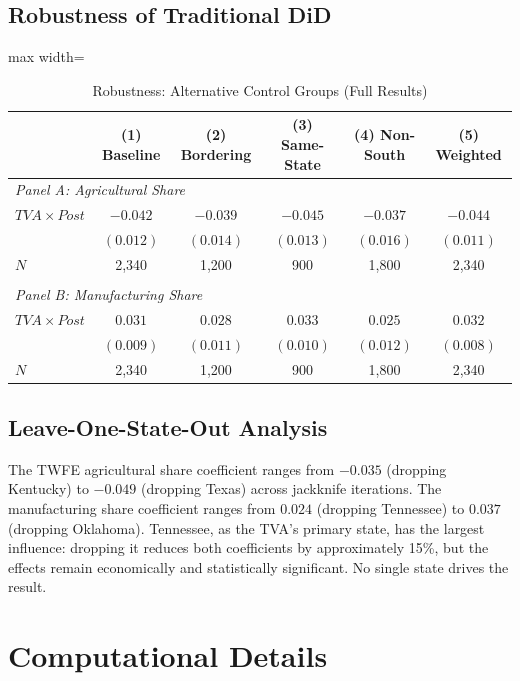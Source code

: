 \documentclass[12pt]{article}
\begin{document}
\subsection{Robustness of Traditional DiD}

\begin{table}[H]
\centering
\caption{Robustness: Alternative Control Groups (Full Results)}
\label{tab:robustness_full}
\begin{adjustbox}{max width=\textwidth}
\begin{tabular}{lccccc}
\toprule
& (1) Baseline & (2) Bordering & (3) Same-State & (4) Non-South & (5) Weighted \\
\midrule
\multicolumn{6}{l}{\textit{Panel A: Agricultural Share}} \\
$TVA \times Post$ & $-0.042$ & $-0.039$ & $-0.045$ & $-0.037$ & $-0.044$ \\
& $(0.012)$ & $(0.014)$ & $(0.013)$ & $(0.016)$ & $(0.011)$ \\
$N$ & 2,340 & 1,200 & 900 & 1,800 & 2,340 \\
\\
\multicolumn{6}{l}{\textit{Panel B: Manufacturing Share}} \\
$TVA \times Post$ & $0.031$ & $0.028$ & $0.033$ & $0.025$ & $0.032$ \\
& $(0.009)$ & $(0.011)$ & $(0.010)$ & $(0.012)$ & $(0.008)$ \\
$N$ & 2,340 & 1,200 & 900 & 1,800 & 2,340 \\
\bottomrule
\end{tabular}
\end{adjustbox}
\end{table}

\subsection{Leave-One-State-Out Analysis}

The TWFE agricultural share coefficient ranges from $-0.035$ (dropping Kentucky) to $-0.049$ (dropping Texas) across jackknife iterations. The manufacturing share coefficient ranges from $0.024$ (dropping Tennessee) to $0.037$ (dropping Oklahoma). Tennessee, as the TVA's primary state, has the largest influence: dropping it reduces both coefficients by approximately 15\%, but the effects remain economically and statistically significant. No single state drives the result.


\section{Computational Details}\label{app:computational}
\end{document}
